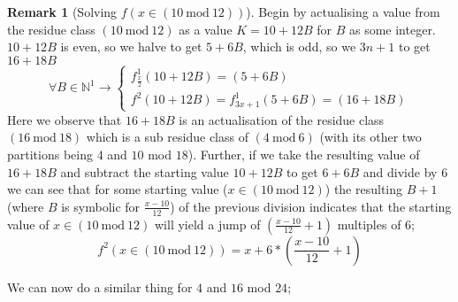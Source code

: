 \documentclass[12pt,a4paper]{amsart}
\numberwithin{equation}{section}
\theoremstyle{plain}
\theoremstyle{definition}
\newtheorem{Rem}[Th]{Remark}
\begin{document}
\begin{Rem}[Solving $f \left ( x \in \left ( 10\:\mathrm{mod}\:12 \right ) \right )$]
Begin by actualising a value from the residue class $\left ( 10\:\mathrm{mod}\:12 \right )$ as a value $K = 10 + 12B$ for $B$ as some integer. $10 + 12B$ is even, so we halve to get $5 + 6B$, which is odd, so we $3n+1$ to get $16+18B$
\begin{equation}
\forall B \in \mathbb{N}^{1} \rightarrow \left \{  \begin{matrix}
f^{1}_{\frac{x}{2}} \left ( 10+12B \right ) = \left ( 5+6B \right ) \\ 
f^{2} \left ( 10+12B \right ) = f^{1}_{3x+1} \left ( 5+6B \right ) =  \left ( 16+18B \right )
\end{matrix} \right.
\end{equation}
Here we observe that $16+18B$ is an actualisation of the residue class  $\left ( 16\:\mathrm{mod}\:18 \right )$ which is a sub residue class of  $\left ( 4\:\mathrm{mod}\:6 \right )$ (with its other two partitions being $4$ and $10$ mod $18$). Further, if we take the resulting value of $16+18B$ and subtract the starting value $10+12B$ to get $6+6B$ and divide by $6$ we can see that for some starting value ($x \in \left ( 10\:\mathrm{mod}\:12 \right )$) the resulting $B+1$ (where $B$ is symbolic for $\frac{x-10}{12}$) of the previous division indicates that the starting value of $x \in \left ( 10\:\mathrm{mod}\:12 \right )$ will yield a jump of $\left ( \frac{x-10}{12} + 1 \right )$ multiples of $6$;
\begin{equation}
f^{2} \left ( x \in \left ( 10\:\mathrm{mod}\:12 \right ) \right ) = x+6*\left ( \frac{x-10}{12} + 1 \right )
\end{equation}
\end{Rem}

We can now do a similar thing for $4$ and $16$ mod $24$;
\end{document}
